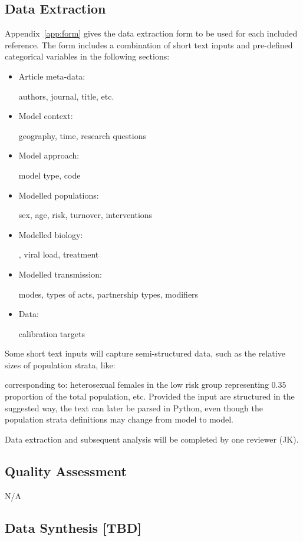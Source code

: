 \documentclass{article}
\begin{document}
\subsection{Data Extraction}
Appendix~\ref{app:form} gives the data extraction form to be used
for each included reference.
The form includes a combination of
short text inputs and pre-defined categorical variables
in the following sections:
\newcommand{\ibox}[1]{\parbox{0.25\linewidth}{#1}}
\begin{itemize}
	\item \ibox{Article meta-data:}     authors, journal, title, etc.
	\item \ibox{Model context:}         geography, time, research questions
	\item \ibox{Model approach:}        model type, code
	\item \ibox{Modelled populations:}  sex, age, risk, turnover, interventions
	\item \ibox{Modelled biology:}      \cdf, viral load, treatment
	\item \ibox{Modelled transmission:} modes, types of acts, partnership types, modifiers
	\item \ibox{Data:}                  calibration targets
\end{itemize}
Some short text inputs will capture semi-structured data,
such as the relative sizes of population strata, like:
\par
\par
corresponding to: heterosexual females in the low risk group representing
$0.35$ proportion of the total population, etc.
Provided the input are structured in the suggested way,
the text can later be parsed in Python,
even though the population strata definitions may change from model to model.
\par
Data extraction and subsequent analysis will be completed by one reviewer (JK).
\subsection{Quality Assessment}
N/A
\subsection{Data Synthesis [TBD]}
\end{document}
